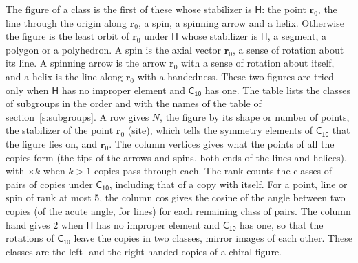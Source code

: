 \documentclass[10pt,a4paper]{article}
\numberwithin{equation}{section}
\newcommand{\grp}[1]{\mathsf{#1}}
\newcommand{\pointr}{\mathbf{r}}
\begin{document}
\leavevmode\label{n:head.figure}The figure of a class is the first of these whose stabilizer is $\grp{H}$: the point $\pointr_0$, the line through the origin along $\pointr_0$, a spin, a spinning arrow and a helix. Otherwise the figure is the least orbit of $\pointr_0$ under $\grp{H}$ whose stabilizer is $\grp{H}$, a segment, a polygon or a polyhedron. A spin is the axial vector $\pointr_0$, a sense of rotation about its line. A spinning arrow is the arrow $\pointr_0$ with a sense of rotation about itself, and a helix is the line along $\pointr_0$ with a handedness. These two figures are tried only when $\grp{H}$ has no improper element and $\grp{C_{10}}$ has one. The table lists the classes of subgroups in the order and with the names of the table of section~\ref{s:subgroups}. \label{n:head.site}A row gives $N$, the figure by its shape or number of points, the stabilizer of the point $\pointr_0$ (site), which tells the symmetry elements of $\grp{C_{10}}$ that the figure lies on, and $\pointr_0$. \label{n:head.vertices}The column vertices gives what the points of all the copies form (the tips of the arrows and spins, both ends of the lines and helices), with ${\times}k$ when $k > 1$ copies pass through each. \label{n:head.rank}The rank counts the classes of pairs of copies under $\grp{C_{10}}$, including that of a copy with itself. \label{n:head.cos}For a point, line or spin of rank at most 5, the column cos gives the cosine of the angle between two copies (of the acute angle, for lines) for each remaining class of pairs. \label{n:head.hand}The column hand gives 2 when $\grp{H}$ has no improper element and $\grp{C_{10}}$ has one, so that the rotations of $\grp{C_{10}}$ leave the copies in two classes, mirror images of each other. These classes are the left- and the right-handed copies of a chiral figure.
\end{document}
